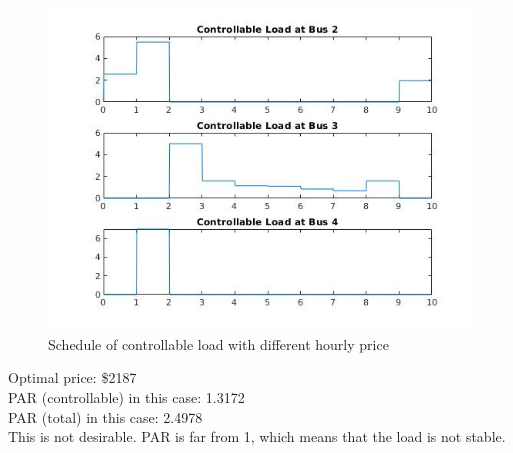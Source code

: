 \documentclass[11pt]{article}
\begin{document}
\begin{figure}[H]
    \centering
    \includegraphics[scale=0.6]{figs/q3.jpg}
    \caption{Schedule of controllable load with different hourly price}
    \label{fig::q3}
\end{figure}

\noindent
Optimal price: \$2187   \\
PAR (controllable) in this case: 1.3172    \\
PAR (total) in this case: 2.4978    \\ 
This is not desirable. PAR is far from 1, which means that the load is not stable.


\end{document}
